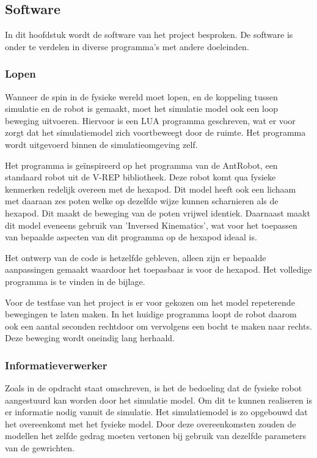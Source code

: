 \documentclass[10pt,a4paper]{article}
\begin{document}
\newpage
\subsection{Software}
In dit hoofdstuk wordt de software van het project besproken. De software is onder te verdelen in diverse programma's met andere doeleinden.

\subsubsection{Lopen}
Wanneer de spin in de fysieke wereld moet lopen, en de koppeling tussen simulatie en de robot is gemaakt, moet het simulatie model ook een loop beweging uitvoeren. Hiervoor is een LUA programma geschreven, wat er voor zorgt dat het simulatiemodel zich voortbeweegt door de ruimte. Het programma wordt uitgevoerd binnen de simulatieomgeving zelf.

Het programma is geïnspireerd op het programma van de AntRobot, een standaard robot uit de V-REP bibliotheek. Deze robot komt qua fysieke kenmerken redelijk overeen met de hexapod. Dit model heeft ook een lichaam met daaraan zes poten welke op dezelfde wijze kunnen scharnieren als de hexapod. Dit maakt de beweging van de poten vrijwel identiek. Daarnaast maakt dit model eveneens gebruik van 'Inversed Kinematics', wat voor het toepassen van bepaalde aspecten van dit programma op de hexapod ideaal is.

Het ontwerp van de code is hetzelfde gebleven, alleen zijn er bepaalde aanpassingen gemaakt waardoor het toepasbaar is voor de hexapod. Het volledige programma is te vinden in de bijlage. 

Voor de testfase van het project is er voor gekozen om het model repeterende bewegingen te laten maken. In het huidige programma loopt de robot daarom ook een aantal seconden rechtdoor om vervolgens een bocht te maken naar rechts. Deze beweging wordt oneindig lang herhaald.


\subsubsection{Informatieverwerker}
Zoals in de opdracht staat omschreven, is het de bedoeling dat de fysieke robot aangestuurd kan worden door het simulatie model. Om dit te kunnen realiseren is er informatie nodig vanuit de simulatie. Het simulatiemodel is zo opgebouwd dat het overeenkomt met het fysieke model. Door deze overeenkomsten zouden de modellen het zelfde gedrag moeten vertonen bij gebruik van dezelfde parameters van de gewrichten.
\end{document}
